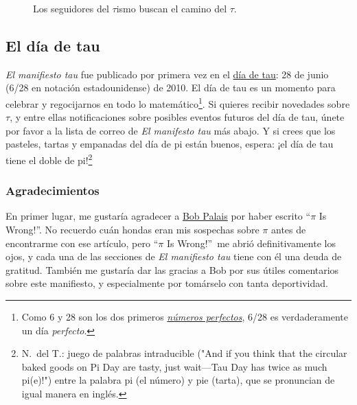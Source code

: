 \begin{figure}
\begin{center}
\end{center}
\caption{Los seguidores del $\tau$ismo buscan el camino del $\tau$.\label{fig:tauism}}
\end{figure}



  \subsection{El día de tau} %
  \label{sec:tau_day}

\emph{El manifiesto tau} fue publicado por primera vez en el \href{http://tauday.com/}{día de tau}: 28 de junio (6/28 en notación estadounidense) de 2010. El día de tau es un momento para celebrar y regocijarnos en todo lo matemático\footnote{Como 6 y 28 son los dos primeros \href{https://es.wikipedia.org/wiki/Número_perfecto}{\emph{números perfectos}}, 6/28 es verdaderamente un día \emph{perfecto}.}. Si quieres recibir novedades sobre $\tau$, y entre ellas notificaciones sobre posibles eventos futuros del día de tau, únete por favor a la lista de correo de \emph{El manifesto tau} más abajo. Y si crees que los pasteles, tartas y empanadas del día de pi están buenos, espera: ¡el día de tau tiene el doble de pi!\footnote{N.~del T.: juego de palabras intraducible ("And if you think that the circular baked goods on Pi Day are tasty, just wait—Tau Day has twice as much pi(e)!") entre la palabra pi (el número) y pie (tarta), que se pronuncian de igual manera en inglés.}



  \subsubsection{Agradecimientos} %
  \label{sec:acknowledgments}

En primer lugar, me gustaría agradecer a \href{http://www.math.utah.edu/~palais}{Bob Palais} por haber escrito ``$\pi$ Is Wrong!''. No recuerdo cuán hondas eran mis sospechas sobre $\pi$ antes de encontrarme con ese artículo, pero ``$\pi$ Is Wrong!''\ me abrió definitivamente los ojos, y cada una de las secciones de \emph{El manifiesto tau} tiene con él una deuda de gratitud. También me gustaría dar las gracias a Bob por sus útiles comentarios sobre este manifiesto, y especialmente por tomárselo con tanta deportividad.

